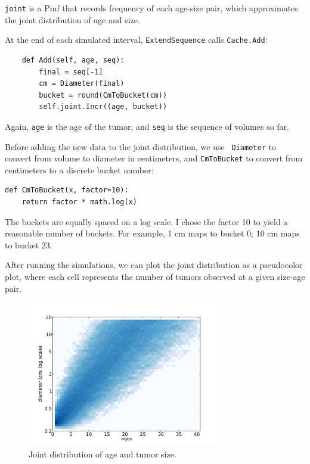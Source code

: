 \documentclass[12pt]{book}
\begin{document}
{\tt joint} is a Pmf that records 
frequency of each age-size pair, which approximates the
joint distribution of age and size.

At the end of each simulated interval, {\tt ExtendSequence} calls
{\tt Cache.Add}:

\begin{verbatim}
    def Add(self, age, seq):
        final = seq[-1]
        cm = Diameter(final)
        bucket = round(CmToBucket(cm))
        self.joint.Incr((age, bucket))
\end{verbatim}

Again, {\tt age} is the age of the tumor, and {\tt seq} is the
sequence of volumes so far.

Before adding the new data to the joint distribution, we use {\tt
  Diameter} to convert from volume to diameter in centimeters, and
{\tt CmToBucket} to convert from centimeters to a discrete bucket
number:

\begin{verbatim}
def CmToBucket(x, factor=10):
    return factor * math.log(x)
\end{verbatim}

The buckets are equally spaced on a log scale.  I chose the
factor 10 to yield a reasonable number of buckets.  For example,
1 cm maps to bucket 0; 10 cm maps to bucket 23.

After running the simulations, we can plot the joint distribution
as a pseudocolor plot, where each cell represents the number of
tumors observed at a given size-age pair.

\begin{figure}
\centerline{\includegraphics[height=2.5in]{figs/kidney8.pdf}}
\caption{Joint distribution of age and tumor size.}
\label{fig.kidney8}
\end{figure}
\end{document}

